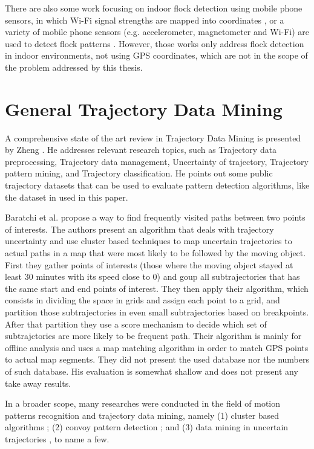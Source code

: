 There are also some work focusing on indoor flock detection using mobile phone sensors, in which Wi-Fi signal strengths
are mapped into coordinates \citep{mobile1}, or a variety of mobile phone sensors (e.g. accelerometer, magnetometer and
Wi-Fi) are used to detect flock patterns \citep{mobile2}. However, those works only address flock detection in indoor
environments, not using GPS coordinates, which are not in the scope of the problem addressed by this thesis.

\section{General Trajectory Data Mining}
\label{sec:rel_general}
A comprehensive state of the art review in Trajectory Data Mining is presented by Zheng \citep{survey}. He addresses
relevant research topics, such as Trajectory data preprocessing, Trajectory data management, Uncertainty of trajectory,
Trajectory pattern mining, and Trajectory classification. He points out some public trajectory datasets that can be used
to evaluate pattern detection algorithms, like the dataset in \citep{tdrive} used in this paper.

Baratchi et al. propose a way to find frequently visited paths between two points of interests. The authors present an
algorithm that deals with trajectory uncertainty and use cluster based techniques to map uncertain trajectories to
actual paths in a map that were most likely to be followed by the moving object. First they gather points of interests
(those where the moving object stayed at least 30 minutes with its speed close to 0) and goup all subtrajectories that
has the same start and end points of interest. They then apply their algorithm, which consists in dividing the space in
grids and assign each point to a grid, and partition those subtrajectories in even small subtrajectories based on
breakpoints. After that partition they use a score mechanism to decide which set of subtrajctories are more likely to be
frequent path. Their algorithm is mainly for offline analysis and uses a map matching algorithm in order to match GPS
points to actual map segments. They did not present the used database nor the numbers of such database. His evaluation
is somewhat shallow and does not present any take away results.

In a broader scope, many researches were conducted in the field of motion patterns recognition and trajectory data
mining, namely (1) cluster based algorithms
\citep{clusters2}; (2) convoy pattern detection
; and (3) data mining in uncertain
trajectories \citep{uncertain1}\citep{uncertain2}\citep{uncertain3}\citep{uncertain4}, to name a few.

